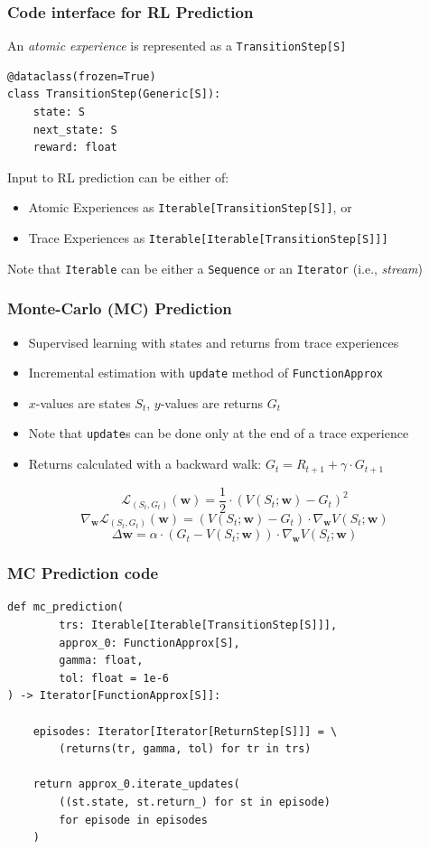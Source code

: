 \documentclass[handout]{beamer}
\begin{document}
\begin{frame}[fragile]
\frametitle{Code interface for RL Prediction}
\pause
An {\em atomic experience} is represented as a \lstinline{TransitionStep[S]}
\pause
\begin{lstlisting}
@dataclass(frozen=True)
class TransitionStep(Generic[S]):
    state: S
    next_state: S
    reward: float
\end{lstlisting}
\pause
\vspace{3mm}
Input to RL prediction can be either of:
\pause
\begin{itemize}[<+->]
\item Atomic Experiences as \lstinline{Iterable[TransitionStep[S]]}, or
\item Trace Experiences as \lstinline{Iterable[Iterable[TransitionStep[S]]]}
\end{itemize}
\pause
\vspace{3mm}
Note that \lstinline{Iterable} can be either a \lstinline{Sequence} or an \lstinline{Iterator} (i.e., {\em stream})
\end{frame}


\begin{frame}
\frametitle{Monte-Carlo (MC) Prediction}
\pause
\begin{itemize}[<+->]
\item Supervised learning with states and returns from trace experiences
\item Incremental estimation with \lstinline{update} method of \lstinline{FunctionApprox}
\item $x$-values are states $S_t$, $y$-values are returns $G_t$
\item Note that \lstinline{update}s can be done only at the end of a trace experience
\item Returns calculated with a backward walk: $G_t = R_{t+1} + \gamma \cdot G_{t+1}$
\end{itemize}
\pause
$$\mathcal{L}_{(S_t,G_t)}(\bm{w}) = \frac 1 2 \cdot (V(S_t;\bm{w}) - G_t)^2$$
\pause
$$\nabla_{\bm{w}} \mathcal{L}_{(S_t,G_t)}(\bm{w}) = (V(S_t;\bm{w}) - G_t) \cdot \nabla_{\bm{w}} V(S_t;\bm{w})$$
\pause
$$\Delta \bm{w} = \alpha \cdot (G_t - V(S_t;\bm{w})) \cdot \nabla_{\bm{w}} V(S_t;\bm{w})$$
\end{frame}

\begin{frame}[fragile]
\frametitle{MC Prediction code}
\pause
\begin{lstlisting}
def mc_prediction(
        trs: Iterable[Iterable[TransitionStep[S]]],
        approx_0: FunctionApprox[S],
        gamma: float,
        tol: float = 1e-6
) -> Iterator[FunctionApprox[S]]:

    episodes: Iterator[Iterator[ReturnStep[S]]] = \
        (returns(tr, gamma, tol) for tr in trs)

    return approx_0.iterate_updates(
        ((st.state, st.return_) for st in episode)
        for episode in episodes
    )
\end{lstlisting}    
\end{frame}
\end{document}
